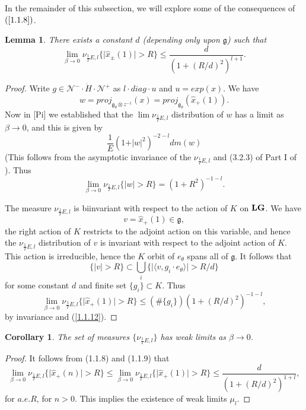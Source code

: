\documentclass{amsart}
\newtheorem{lemma}{Lemma}
\newtheorem{corollary}{Corollary}
\theoremstyle{conjecture}
\theoremstyle{definition}
\theoremstyle{question}
\theoremstyle{questions}
\theoremstyle{remark}
\theoremstyle{remarks}
\theoremstyle{example}
\numberwithin{equation}{section}
\begin{document}
In the remainder of this subsection, we will explore
some of the consequences of $(\ref{1.1.8})$.

\begin{lemma}\label{1.1.9}There exists a constant $d$
(depending only upon $\mathfrak g$) such that
$$\lim_{\beta\to 0}\nu_{\frac 1T E ,l}\{\vert\hat {x}_{\pm}(1)\vert >R
\}\le\frac d{(1+(R/d)^2)^{l+1}}.$$
\end{lemma}

\begin{proof}  Write $g\in \mathcal N^{-}\cdot\dot {H}\cdot \mathcal N^{
+}$ as $l\cdot diag\cdot u$ and
$u=exp(x)$.  We have
$$w=proj_{\mathfrak g_{\theta}\otimes z^{-1}}(x)=proj_{\mathfrak g_{\theta}}
(\hat {x}_{+}(1)). \label{1.1.10}$$
Now in [Pi] we established that the $\lim\nu_{\frac 1T E ,l}$ distribution
of $w$ has a limit as $\beta\to 0$, and this is given by
$$\frac 1E(1+\vert w\vert^2)^{-2-l}dm(w) \label{1.1.11}$$
(This follows from the asymptotic invariance of the $\nu_{\frac 1T E ,
l}$
and (3.2.3) of Part I of \cite{Pi1}).  Thus
$$\lim_{\beta\to 0}\nu_{\frac 1T E ,l}\{\vert w\vert >R\}=(1+R^2)^{-1-
l}. \label{1.1.12}$$

The measure $\nu_{\frac 1T E ,l}$ is biinvariant with respect to the
action of $K$ on $\bf{L} G$.  We have
$$v=\hat {x}_{+}(1)\in \mathfrak g, \label{1.1.13}$$
the right action of $K$ restricts to the adjoint action on
this variable, and hence the $\nu_{\frac 1T E ,l}$ distribution of $v$ is
invariant with respect to the adjoint action of $K$.  This
action is irreducible, hence the $K$ orbit of $e_{\theta}$ spans all of
$\mathfrak g$.  It follows that
$$\{\vert v\vert >R\}\subset\bigcup_i\{\vert\langle v,g_i\cdot e_{
\theta}\rangle\vert >R/d\} \label{1.1.14}$$
for some constant $d$ and finite set $\{g_i\}\subset K$.  Thus
$$\lim_{\beta\to 0}\nu_{\frac 1T E ,l}\{\vert\hat {x}_{+}(1)\vert >R\}
\le (\#\{g_i\})(1+(R/d)^2)^{-1-l}, \label{1.1.15}$$
by invariance and (\ref{1.1.12}).  \end{proof}

\begin{corollary}\label{1.1.16} The set of measures $\{\nu_{\frac 1T E ,l}
\}$ has
weak limits as $\beta\to 0$.
\end{corollary}

 \begin{proof}  It follows from (1.1.8) and (1.1.9) that
$$\lim_{\beta\to 0}\nu_{\frac 1T E ,l}\{\vert\hat {x}_{+}(n)\vert >R\}
\le\lim_{\beta\to 0}\nu_{\frac 1T E ,l}\{\vert\hat {x}_{+}(1)\vert >R\}
\le\frac d{(1+(R/d)^2)^{1+l}}, \label{1.1.17}$$
for $a.e.R$, for $n>0$.  This implies the existence of weak
limits $\mu_l$.\end{proof}
\end{document}
